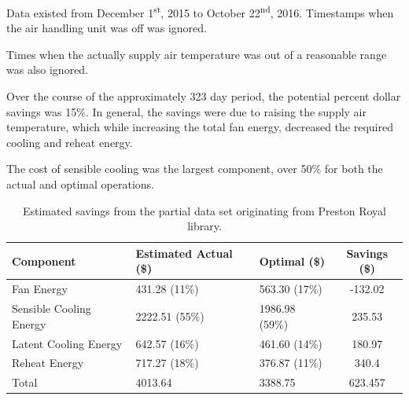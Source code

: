 Data existed from December 1\textsuperscript{st}, 2015 to October
22\textsuperscript{nd}, 2016. Timestamps when the air handling unit was
off was ignored. 

Times when the actually supply air temperature was out of a reasonable
range was also ignored. 

Over the course of the approximately 323 day period, the potential
percent dollar savings was 15\%. In general, the savings were due to
raising the supply air temperature, which while increasing the total fan
energy, decreased the required cooling and reheat energy. 

The cost of sensible cooling was the largest component, over 50\% for
both the actual and optimal operations. 

\begin{table}
\centering
\caption{Estimated savings from the partial data set originating from Preston Royal library.}
\label{tab:prestonRoyalSavings}

\begin{tabular}{lllS}
\toprule
    Component               & { Estimated Actual (\$) } & { Optimal (\$) }     & { Savings (\$) } \\ \midrule
    Fan Energy              & \num{431.28} (11\%)       & \num{563.30} (17\%)  & -132.02          \\
    Sensible Cooling Energy & \num{2222.51} (55\%)      & \num{1986.98} (59\%) & 235.53           \\
    Latent Cooling Energy   & \num{642.57} (16\%)       & \num{461.60} (14\%)  & 180.97           \\
    Reheat Energy           & \num{717.27} (18\%)       & \num{376.87}  (11\%) & 340.4            \\ \midrule
    Total                   & \num{4013.64}             & \num{3388.75}        & 623.457          \\ \bottomrule
\end{tabular}

\end{table}



